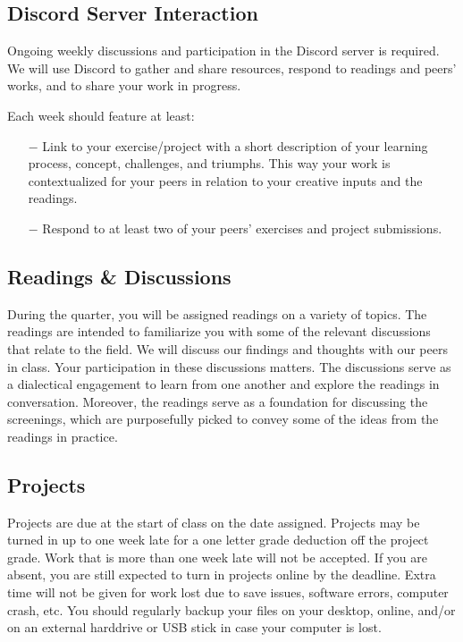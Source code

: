 \documentclass[12pt,letter,english]{report}
\providecommand{\tightlist}{%
      \setlength{\itemsep}{0pt}\setlength{\parskip}{0pt}%
}
\begin{document}
\subsection{Discord Server Interaction}
Ongoing weekly discussions and participation in the Discord server is required. We will use Discord to gather and share resources, respond to readings and peers' works, and to share your work in progress.

Each week should feature at least:
\begin{itemize}
      \tightlist
      \item[$-$] Link to your exercise/project with a short description of your learning process, concept, challenges, and triumphs. This way your work is contextualized for your peers in relation to your creative inputs and the readings.
      \item[$-$] Respond to at least two of your peers' exercises and project submissions.
\end{itemize}

\subsection{Readings \& Discussions}

During the quarter, you will be assigned readings on a variety of topics. The readings are intended to familiarize you with some of the relevant discussions that relate to the field. We will discuss our findings and thoughts with our peers in class. Your participation in these discussions matters. The discussions serve as a dialectical engagement to learn from one another and explore the readings in conversation. Moreover, the readings serve as a foundation for discussing the screenings, which are purposefully picked to convey some of the ideas from the readings in practice.

\subsection{Projects}

Projects are due at the start of class on the date assigned. Projects may be turned in up to one week late for a one letter grade deduction off the project grade. Work that is more than one week late will not be accepted. If you are absent, you are still expected to turn in projects online by the deadline. Extra time will not be given for work lost due to save issues, software errors, computer crash, etc. You should regularly backup your files on your desktop, online, and/or on an external harddrive or USB stick in case your computer is lost.
\end{document}
